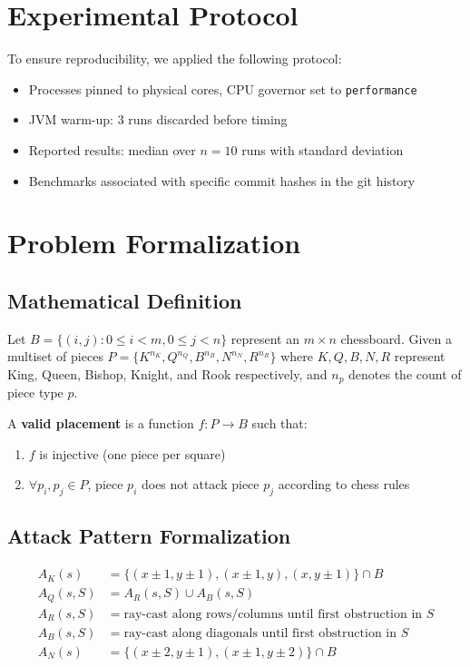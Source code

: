 \documentclass[12pt,a4paper]{article}
\theoremstyle{definition}
\begin{document}
\section{Experimental Protocol}

To ensure reproducibility, we applied the following protocol:
\begin{itemize}
    \item Processes pinned to physical cores, CPU governor set to \texttt{performance}
    \item JVM warm-up: 3 runs discarded before timing
    \item Reported results: median over $n=10$ runs with standard deviation
    \item Benchmarks associated with specific commit hashes in the git history
\end{itemize}

\section{Problem Formalization}

\subsection{Mathematical Definition}

Let $B = \{(i,j) : 0 \leq i < m, 0 \leq j < n\}$ represent an $m \times n$ chessboard. Given a multiset of pieces $P = \{K^{n_K}, Q^{n_Q}, B^{n_B}, N^{n_N}, R^{n_R}\}$ where $K, Q, B, N, R$ represent King, Queen, Bishop, Knight, and Rook respectively, and $n_p$ denotes the count of piece type $p$.

A \textbf{valid placement} is a function $f: P \rightarrow B$ such that:
\begin{enumerate}
\item $f$ is injective (one piece per square)
\item $\forall p_i, p_j \in P$, piece $p_i$ does not attack piece $p_j$ according to chess rules
\end{enumerate}

\subsection{Attack Pattern Formalization}

\begin{align}
A_K(s) &= \{(x \pm 1, y \pm 1), (x \pm 1, y), (x, y \pm 1)\} \cap B \\
A_Q(s, S) &= A_R(s, S) \cup A_B(s, S) \\
A_R(s, S) &= \text{ray-cast along rows/columns until first obstruction in } S \\
A_B(s, S) &= \text{ray-cast along diagonals until first obstruction in } S \\
A_N(s) &= \{(x \pm 2, y \pm 1), (x \pm 1, y \pm 2)\} \cap B
\end{align}
\end{document}
